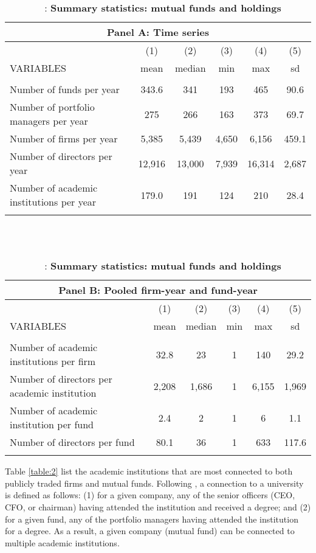 \documentclass[11pt]{article}
\begin{document}
\begin{doublespace}
\begin{table}
\caption{ \ \ : \large \bf Summary statistics: mutual funds and holdings}
\vspace*{10mm}
\begin{tabular}{lccccc}
\multicolumn{6}{c}{Panel A: Time series} \\ \hline
 & (1) & (2) & (3) & (4) & (5) \\
VARIABLES & mean & median & min & max & sd \\ \hline
 &  &  &  &  &  \\
Number of funds per year & 343.6 & 341 & 193 & 465 & 90.6 \\
Number of portfolio managers per year & 275 & 266 & 163 & 373 & 69.7 \\
Number of firms per year & 5,385 & 5,439 & 4,650 & 6,156 & 459.1 \\
Number of directors per year & 12,916 & 13,000 & 7,939 & 16,314 & 2,687 \\
Number of academic institutions per year & 179.0 & 191 & 124 & 210 & 28.4 \\
 &  &  &  &  &  \\ \hline
\end{tabular}
\\
\vspace*{10mm}
\\
\begin{tabular}{lccccc}
\multicolumn{6}{c}{Panel B: Pooled firm-year and fund-year} \\ \hline
 & (1) & (2) & (3) & (4) & (5) \\
VARIABLES & mean & median & min & max & sd \\ \hline
 &  &  &  &  &  \\
Number of academic institutions per firm & 32.8 & 23 & 1 & 140 & 29.2 \\
Number of directors per academic institution & 2,208 & 1,686 & 1 & 6,155 & 1,969 \\
Number of academic institution per fund & 2.4 & 2 & 1 & 6 & 1.1 \\
Number of directors per fund & 80.1 & 36 & 1 & 633 & 117.6 \\
 &  &  &  &  &  \\ \hline
\end{tabular}
\vspace*{10mm}
\label{table:1}
\end{table}

Table \ref{table:2} list the academic institutions that are most connected to both publicly traded firms and mutual funds. Following \cite{cohen2008small}, a connection to a university is defined as follows: (1) for a given company, any of the senior officers (CEO, CFO, or chairman) having attended the institution and received a degree; and (2) for a given fund, any of the portfolio managers having attended the institution for a degree. As a result, a given company (mutual fund) can be connected to multiple academic institutions. 


\end{doublespace}
\end{document}
